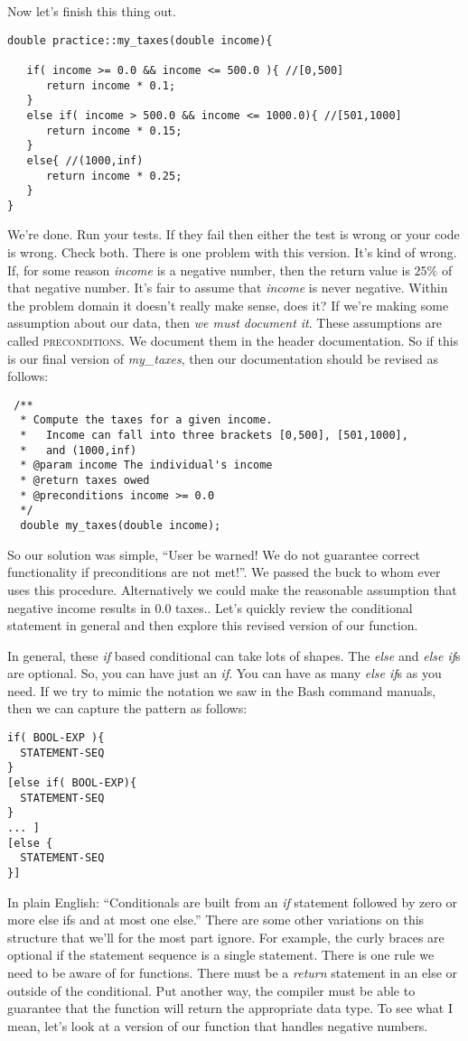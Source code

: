 \documentclass[]{tufte-handout}
\begin{document}
Now let's finish this thing out.
\begin{verbatim}
double practice::my_taxes(double income){

   if( income >= 0.0 && income <= 500.0 ){ //[0,500]
      return income * 0.1;
   }
   else if( income > 500.0 && income <= 1000.0){ //[501,1000]
      return income * 0.15;   
   }
   else{ //(1000,inf) 
      return income * 0.25;   
   }
}
\end{verbatim}
We're done. Run your tests. If they fail then either the test is wrong or your code is wrong. Check both. There is one problem with this version. It's kind of wrong. If, for some reason \textit{income} is a negative number, then the return value is $25\%$ of that negative number.  It's fair to assume that \textit{income} is never negative. Within the problem domain it doesn't really make sense, does it?  If we're making some assumption about our data, then \textit{we must document it}. These assumptions are called \textsc{preconditions}.  We document them in the header documentation. So if this is our final version of \textit{my\_taxes}, then our documentation should be revised as follows:
\begin{verbatim}
 /** 
  * Compute the taxes for a given income.
  *   Income can fall into three brackets [0,500], [501,1000], 
  *   and (1000,inf)
  * @param income The individual's income 
  * @return taxes owed
  * @preconditions income >= 0.0
  */
  double my_taxes(double income);
\end{verbatim}
So our solution was simple, ``User be warned! We do not guarantee correct functionality if preconditions are not met!''.  We passed the buck to whom ever uses this procedure. Alternatively we could make the reasonable assumption that negative income results in $0.0$ taxes.. Let's quickly review the conditional statement in general and then explore this revised version of our function.


In general, these \textit{if} based conditional can take lots of shapes. The \textit{else} and \textit{else if}s are optional. So, you can have just an \textit{if}. You can have as many \textit{else if}s as you need. If we try to mimic the notation we saw in the Bash command manuals, then we can capture the pattern as follows:
\begin{verbatim}
if( BOOL-EXP ){
  STATEMENT-SEQ
}
[else if( BOOL-EXP){
  STATEMENT-SEQ
}
... ]
[else {
  STATEMENT-SEQ
}]
\end{verbatim}
In plain English: ``Conditionals are built from an \textit{if} statement followed by zero or more else ifs and at most one else.''  There are some other variations on this structure that we'll for the most part ignore.  For example, the curly braces are optional if the statement sequence is a single statement. There is one rule we need to be aware of for functions. There must be a \textit{return} statement in an else or outside of the conditional. Put another way, the compiler must be able to guarantee that the function will return the appropriate data type. To see what I mean, let's look at a version of our function that handles negative numbers. 
\end{document}
